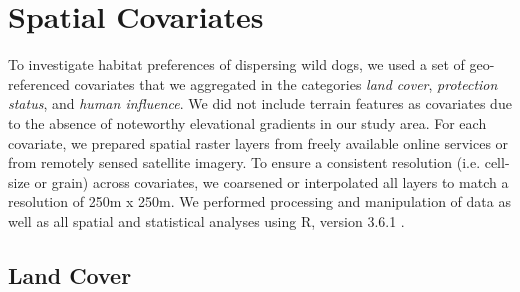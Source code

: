 \documentclass[abstract=off,10pt,a4paper,bibliography=totocnumbered]{article}
\begin{document}
\newpage
\section{Spatial Covariates}
To investigate habitat preferences of dispersing wild dogs, we used a set of
geo-referenced covariates that we aggregated in the categories \textit{land
cover}, \textit{protection status}, and \textit{human influence}. We did not
include terrain features as covariates due to the absence of noteworthy
elevational gradients in our study area. For each covariate, we prepared spatial
raster layers from freely available online services or from remotely sensed
satellite imagery. To ensure a consistent resolution (i.e. cell-size or grain)
across covariates, we coarsened or interpolated all layers to match a resolution
of 250m x 250m. We performed processing and manipulation of data as well as all
spatial and statistical analyses using R, version 3.6.1 \citep{R.2019}.

\subsection{Land Cover}
\end{document}
